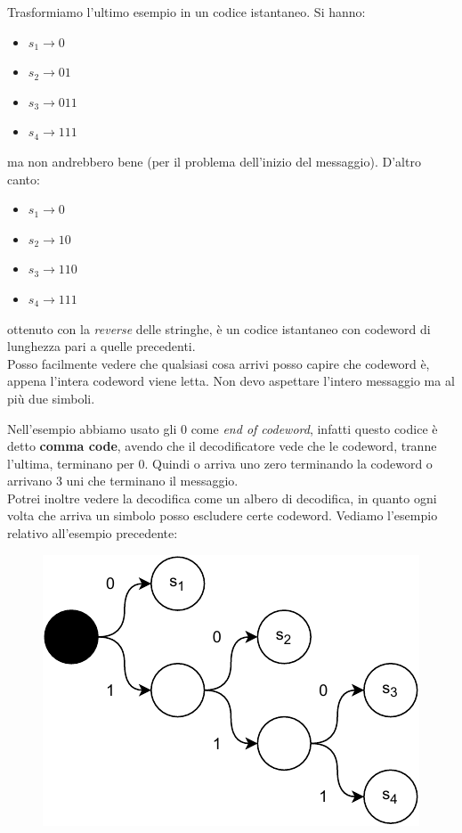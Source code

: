 \documentclass[a4paper,12pt, oneside]{book}
\begin{document}
\begin{esempio}
  Trasformiamo l'ultimo esempio in un codice istantaneo. Si hanno:
  \begin{itemize}
    \item $s_1\to 0$
    \item $s_2\to 01$
    \item $s_3\to 011$
    \item $s_4\to 111$
  \end{itemize}
  ma non andrebbero bene (per il problema dell'inizio del messaggio). D'altro
  canto:
   \begin{itemize}
    \item $s_1\to 0$
    \item $s_2\to 10$
    \item $s_3\to 110$
    \item $s_4\to 111$
  \end{itemize}
  ottenuto con la \textit{reverse} delle stringhe, è un codice istantaneo con
  codeword di lunghezza pari a quelle precedenti.\\
  Posso facilmente vedere che qualsiasi cosa arrivi posso capire che codeword è,
  appena l'intera codeword viene letta. Non devo aspettare l'intero messaggio ma
  al più due simboli.
\end{esempio}
Nell'esempio abbiamo usato gli $0$ come \textit{end of codeword}, infatti questo
codice è detto \textbf{comma code}, avendo che il decodificatore vede che le
codeword, tranne l'ultima, terminano per 0. Quindi o arriva uno zero terminando
la codeword o arrivano 3 uni che terminano il messaggio.\\
Potrei inoltre vedere la decodifica come un albero di
decodifica, in quanto ogni volta che arriva un simbolo posso escludere certe
codeword.
\newpage
Vediamo l'esempio relativo all'esempio precedente:
\begin{figure}[H]
  \centering
  \includegraphics[scale = 0.8]{img/ct.pdf}
\end{figure}
\end{document}
